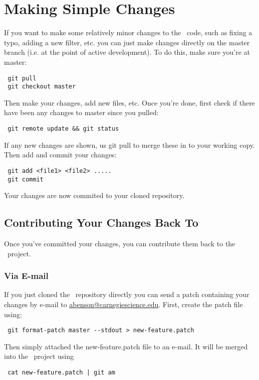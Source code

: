 \section{Making Simple Changes}

If you want to make some relatively minor changes to the \glc\ code, such as fixing a typo, adding a new filter, etc. you can just make changes directly on the {\normalfont \ttfamily master} branch (i.e. at the point of active development). To do this, make sure you're at {\normalfont \ttfamily master}:
\begin{verbatim}
 git pull
 git checkout master
\end{verbatim}
Then make your changes, add new files, etc. Once you're done, first check if there have been any changes to {\normalfont \ttfamily master} since you {\normalfont \ttfamily pull}ed:
\begin{verbatim}
 git remote update && git status
\end{verbatim}
If any new changes are shown, us {\normalfont \ttfamily git pull} to merge these in to your working copy. Then add and commit your changes:
\begin{verbatim}
 git add <file1> <file2> .....
 git commit
\end{verbatim}
Your changes are now commited to your cloned repository.

\subsection{Contributing Your Changes Back To \glc}

Once you've committed your changes, you can contribute them back to the \glc\ project.

\subsubsection{Via E-mail}

If you just cloned the \glc\ repository directly you can send a patch containing your changes by e-mail to \href{mailto:abenson@carnegiescience.edu}{abenson{@}carnegiescience.edu}. First, create the patch file using:
\begin{verbatim}
 git format-patch master --stdout > new-feature.patch
\end{verbatim}
Then simply attached the {\normalfont \ttfamily new-feature.patch} file to an e-mail. It will be merged into the \glc\ project using
\begin{verbatim}
 cat new-feature.patch | git am
\end{verbatim}

